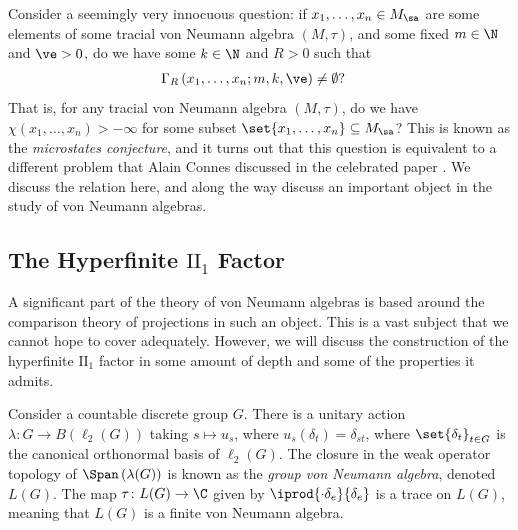 \documentclass[10pt]{mypackage}
\begin{document}
Consider a seemingly very innocuous question: if $x_1,\dots,x_n\in M_{\sa}$ are some elements of some tracial von Neumann algebra $\left( M,\tau \right)$, and some fixed $m\in \N$ and $\ve > 0$, do we have some $k\in \N$ and $R > 0$ such that
\begin{align*}
  \Gamma_R\left( x_1,\dots,x_n;m,k,\ve \right) &\neq \emptyset?
\end{align*}
That is, for any tracial von Neumann algebra $\left( M,\tau \right)$, do we have $\chi\left( x_1,\dots,x_n \right)> -\infty$ for some subset $\set{x_1,\dots,x_n}\subseteq M_{\sa}$? This is known as the \textit{microstates conjecture}, and it turns out that this question is equivalent to a different problem that Alain Connes discussed in the celebrated paper \cite{connes_classification_injective_factors}. We discuss the relation here, and along the way discuss an important object in the study of von Neumann algebras.
\subsection{The Hyperfinite $\text{II}_1$ Factor}%
A significant part of the theory of von Neumann algebras is based around the comparison theory of projections in such an object. This is a vast subject that we cannot hope to cover adequately. However, we will discuss the construction of the hyperfinite $\text{II}_1$ factor in some amount of depth and some of the properties it admits.

Consider a countable discrete group $G$. There is a unitary action $\lambda\colon G\rightarrow B\left( \ell_2\left( G \right) \right)$ taking $s\mapsto u_s$, where $u_s\left( \delta_t \right) = \delta_{st}$, where $\set{\delta_t}_{t\in G}$ is the canonical orthonormal basis of $\ell_2\left( G \right)$. The closure in the weak operator topology of $\Span\left( \lambda(G) \right)$ is known as the \textit{group von Neumann algebra}, denoted $L(G)$. The map $\tau\colon L(G)\rightarrow \C$ given by $ \iprod{\cdot \delta_e}{\delta_e} $ is a trace on $L(G)$, meaning that $L(G)$ is a finite von Neumann algebra.
\end{document}
